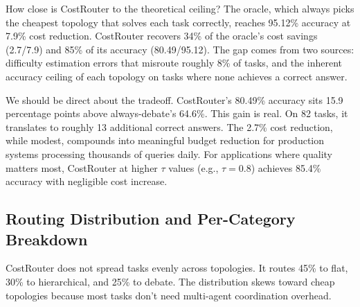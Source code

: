 How close is CostRouter to the theoretical ceiling? The oracle, which always picks the cheapest topology that solves each task correctly, reaches 95.12\% accuracy at 7.9\% cost reduction. CostRouter recovers 34\% of the oracle's cost savings (2.7/7.9) and 85\% of its accuracy (80.49/95.12). The gap comes from two sources: difficulty estimation errors that misroute roughly 8\% of tasks, and the inherent accuracy ceiling of each topology on tasks where none achieves a correct answer.

We should be direct about the tradeoff. CostRouter's 80.49\% accuracy sits 15.9 percentage points above always-debate's 64.6\%. This gain is real. On 82 tasks, it translates to roughly 13 additional correct answers. The 2.7\% cost reduction, while modest, compounds into meaningful budget reduction for production systems processing thousands of queries daily. For applications where quality matters most, CostRouter at higher $\tau$ values (e.g., $\tau = 0.8$) achieves 85.4\% accuracy with negligible cost increase.

\subsection{Routing Distribution and Per-Category Breakdown}\label{routing-distribution-and-per-category-breakdown}

CostRouter does not spread tasks evenly across topologies. It routes 45\% to flat, 30\% to hierarchical, and 25\% to debate. The distribution skews toward cheap topologies because most tasks don't need multi-agent coordination overhead.

\begin{table}[h]
\centering
\caption{Cost breakdown by task category. Token counts in thousands. CostRouter routes tasks within each category to the cheapest topology meeting $\tau = 0.6$.}
\label{tab:cost_breakdown}
\end{table}

